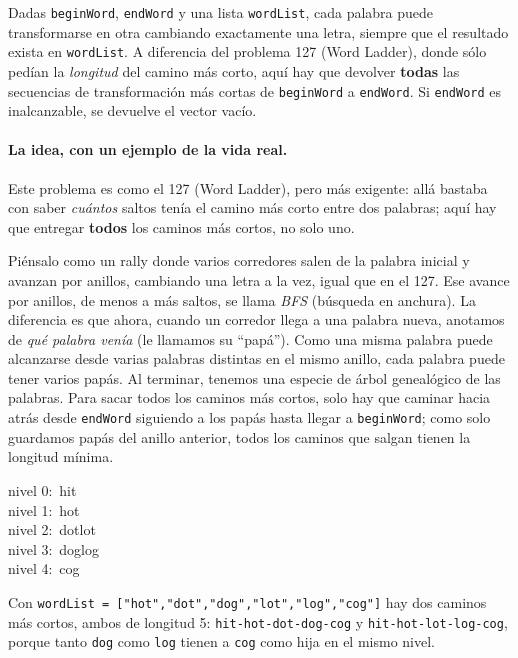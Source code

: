 
Dadas \texttt{beginWord}, \texttt{endWord} y una lista \texttt{wordList},
cada palabra puede transformarse en otra cambiando exactamente una letra,
siempre que el resultado exista en \texttt{wordList}. A diferencia del
problema 127 (Word Ladder), donde sólo pedían la \emph{longitud} del camino
más corto, aquí hay que devolver \textbf{todas} las secuencias de
transformación más cortas de \texttt{beginWord} a \texttt{endWord}. Si
\texttt{endWord} es inalcanzable, se devuelve el vector vacío.

\paragraph{La idea, con un ejemplo de la vida real.} Este problema es como el
127 (Word Ladder), pero más exigente: allá bastaba con saber \emph{cuántos}
saltos tenía el camino más corto entre dos palabras; aquí hay que entregar
\textbf{todos} los caminos más cortos, no solo uno.

Piénsalo como un rally donde varios corredores salen de la palabra inicial y
avanzan por anillos, cambiando una letra a la vez, igual que en el 127. Ese
avance por anillos, de menos a más saltos, se llama \emph{BFS} (búsqueda en
anchura). La diferencia es que ahora, cuando un corredor llega a una palabra
nueva, anotamos de \emph{qué palabra venía} (le llamamos su ``papá''). Como una
misma palabra puede alcanzarse desde varias palabras distintas en el mismo
anillo, cada palabra puede tener varios papás. Al terminar, tenemos una especie
de árbol genealógico de las palabras. Para sacar todos los caminos más cortos,
solo hay que caminar hacia atrás desde \texttt{endWord} siguiendo a los papás
hasta llegar a \texttt{beginWord}; como solo guardamos papás del anillo
anterior, todos los caminos que salgan tienen la longitud mínima.

\begin{center}
\ttfamily
nivel 0:\ hit\\
nivel 1:\ hot\\
nivel 2:\ dot\quad lot\\
nivel 3:\ dog\quad log\\
nivel 4:\ cog
\end{center}

\noindent Con \texttt{wordList = ["hot","dot","dog","lot","log","cog"]} hay
dos caminos más cortos, ambos de longitud 5:
\texttt{hit-hot-dot-dog-cog} y \texttt{hit-hot-lot-log-cog}, porque tanto
\texttt{dog} como \texttt{log} tienen a \texttt{cog} como hija en el mismo
nivel.

